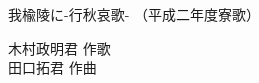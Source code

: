 \documentclass[10pt,b5j]{tarticle} %
\begin{document}
\begin{minipage}[c]{0.7\hsize} %
    \begin{center}
        {\LARGE
            我楡陵に-行秋哀歌- %
        }
        {\small 
            （平成二年度寮歌） %
        }
    \end{center}
\end{minipage}
\begin{minipage}[c]{0.3\hsize} %
    \begin{flushright} %
        木村政明君 作歌\\田口拓君 作曲 %
    \end{flushright}
\end{minipage}
\end{document}
